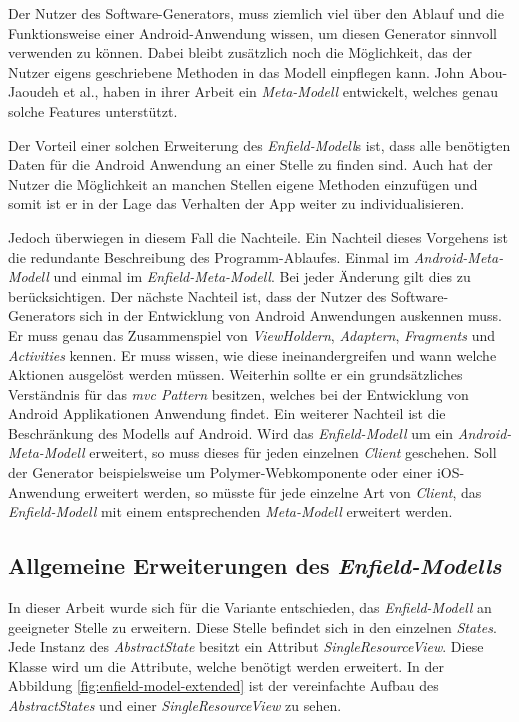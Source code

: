 Der Nutzer des Software-Generators, muss ziemlich viel über den Ablauf und die Funktionsweise einer Android-Anwendung wissen, um diesen Generator sinnvoll verwenden zu können.
Dabei bleibt zusätzlich noch die Möglichkeit, das der Nutzer eigens geschriebene Methoden in das Modell einpflegen kann. John Abou-Jaoudeh et al., haben in ihrer Arbeit ein \textit{Meta-Modell} entwickelt, welches genau solche Features unterstützt\cite{abou2015high}.

Der Vorteil einer solchen Erweiterung des \textit{Enfield-Modell}s ist, dass alle benötigten Daten für die Android Anwendung an einer Stelle zu finden sind. Auch hat der Nutzer die Möglichkeit an manchen Stellen eigene Methoden einzufügen und somit ist er in der Lage das Verhalten der App weiter zu individualisieren.

Jedoch überwiegen in diesem Fall die Nachteile. Ein Nachteil dieses Vorgehens ist die redundante Beschreibung des Programm-Ablaufes. Einmal im \textit{Android-Meta-Modell} und einmal im \textit{Enfield-Meta-Modell}. Bei jeder Änderung gilt dies zu berücksichtigen. 
Der nächste Nachteil ist, dass der Nutzer des Software-Generators sich in der Entwicklung von Android Anwendungen auskennen muss. Er muss genau das Zusammenspiel von \textit{ViewHoldern}, \textit{Adaptern}, \textit{Fragments} und \textit{Activities} kennen. Er muss wissen, wie diese ineinandergreifen und wann welche Aktionen ausgelöst werden müssen. Weiterhin sollte er ein grundsätzliches Verständnis für das \textit{\acf{mvc} Pattern} besitzen, welches bei der Entwicklung von Android Applikationen Anwendung findet.
Ein weiterer Nachteil ist die Beschränkung des Modells auf Android. Wird das \textit{Enfield-Modell} um ein \textit{Android-Meta-Modell} erweitert, so muss dieses für jeden einzelnen \textit{Client} geschehen. Soll der Generator beispielsweise um Polymer-Webkomponente oder einer iOS-Anwendung erweitert werden, so müsste für jede einzelne Art von \textit{Client}, das \textit{Enfield-Modell} mit einem entsprechenden \textit{Meta-Modell} erweitert werden.

\subsection{Allgemeine Erweiterungen des \textit{Enfield-Modells}}

In dieser Arbeit wurde sich für die Variante entschieden, das \textit{Enfield-Modell} an geeigneter Stelle zu erweitern.
Diese Stelle befindet sich in den einzelnen \textit{States}. Jede Instanz des \textit{AbstractState} besitzt ein Attribut \textit{SingleResourceView}. Diese Klasse wird um die  Attribute, welche benötigt werden erweitert. In der Abbildung \ref{fig:enfield-model-extended} ist der vereinfachte Aufbau des \textit{AbstractStates} und einer \textit{SingleResourceView} zu sehen.

